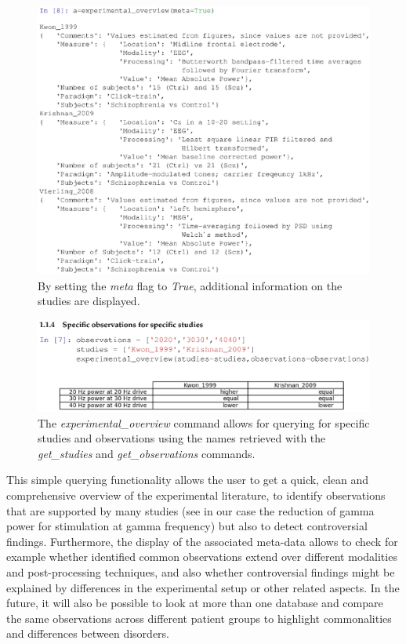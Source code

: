 \documentclass[a4paper,10pt]{article}
\begin{document}
\begin{figure}
\includegraphics[width=\textwidth]{Figures/display_meta2}
\caption{ By setting the \textit{meta} flag to \textit{True}, additional information on the studies are displayed.}
\label{Fig:ExpOverview1}
\end{figure}

\begin{figure}
\includegraphics[width=\textwidth]{Figures/specific_studies_and_observations}
\caption{The \textit{experimental\_overview} command allows for querying for specific studies and observations using the names retrieved with the \textit{get\_studies} and \textit{get\_observations} commands.}
\label{Fig:ExpOverview2}
\end{figure}

This simple querying functionality allows the user to get a quick, clean and comprehensive overview of the experimental literature, to identify observations that are supported by many studies (see in our case the reduction of
gamma power for stimulation at gamma frequency) but also to detect controversial findings. Furthermore, the display of the associated meta-data allows to check for example whether identified common observations extend over
different modalities and post-processing techniques, and also whether controversial findings might be explained by differences in the experimental setup or other related aspects. In the future, it will also be possible 
to look at more than one database and compare the same observations across different patient groups to highlight commonalities and differences between disorders.
\end{document}
